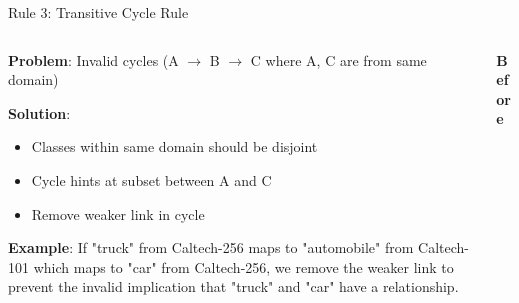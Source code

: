 \documentclass[aspectratio=169]{beamer}
\begin{document}
\begin{frame}{Rule 3: Transitive Cycle Rule}
    \begin{columns}[T]
        \begin{column}{0.55\textwidth}
            \textbf{Problem}: Invalid cycles (A $\rightarrow$ B $\rightarrow$ C where A, C are from same domain)

            \vspace{0.5em}

            \textbf{Solution}:
            \begin{itemize}
                \item Classes within same domain should be disjoint
                \item Cycle hints at subset between A and C
                \item Remove weaker link in cycle
            \end{itemize}

            \vspace{0.5em}

            \textbf{Example}: If "truck" from Caltech-256 maps to "automobile" from Caltech-101 which maps to "car" from Caltech-256, we remove the weaker link to prevent the invalid implication that "truck" and "car" have a relationship.
        \end{column}

        \begin{column}{0.4\textwidth}
            \begin{center}
                \textbf{Before} \\
                \vspace{0.5em}
\end{center}
\end{column}
\end{columns}
\end{frame}
\end{document}
